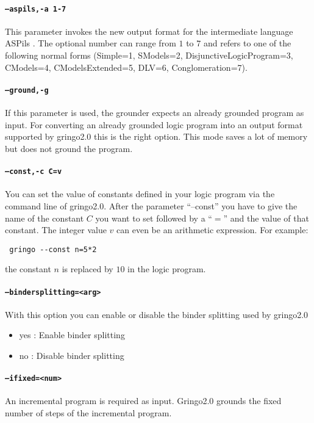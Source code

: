 \documentclass[a4paper,10pt]{article}
\begin{document}
\paragraph{\texttt{--aspils,-a 1-7}}
This parameter invokes the new output format for the intermediate language ASPils \cite{gejaosscth08b}. The optional number can range from $1$ to $7$ and refers to one of the following normal forms (Simple=1, SModels=2, DisjunctiveLogicProgram=3, CModels=4, CModelsExtended=5, DLV=6, Conglomeration=7).

\paragraph{\texttt{--ground,-g}}
If this parameter is used, the grounder expects an already grounded program as input.
For converting an already grounded logic program into an output format supported by gringo2.0 this is the right option. This mode saves a lot of memory but does not ground the program.
\paragraph{\texttt{--const,-c C=v}}
You can set the value of constants defined in your logic program via the command line of gringo2.0.
After the parameter ``--const'' you have to give the name of the constant $C$ you want to set followed by a ``$=$'' and the value of that constant. The integer value $v$ can even be an arithmetic expression. For example:
\begin{verbatim}
 gringo --const n=5*2
\end{verbatim}
the constant $n$ is replaced by $10$ in the logic program.
\paragraph{\texttt{--bindersplitting=<arg>}}
With this option you can enable or disable the binder splitting used by gringo2.0
\begin{itemize}
 \item yes : Enable binder splitting
 \item no  : Disable binder splitting
\end{itemize}
\paragraph{\texttt{--ifixed=<num>}}
An incremental program is required as input. Gringo2.0 grounds the fixed number of steps of the incremental program.
\end{document}
